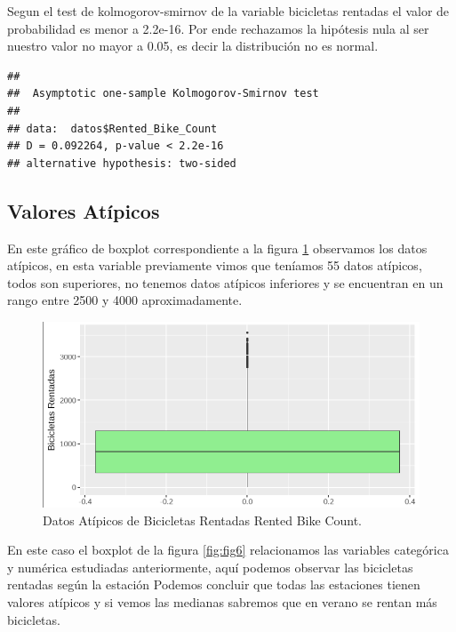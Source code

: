 \documentclass[]{elsarticle} %
\begin{document}
Segun el test de kolmogorov-smirnov de la variable bicicletas rentadas
el valor de probabilidad es menor a 2.2e-16. Por ende rechazamos la
hipótesis nula al ser nuestro valor no mayor a 0.05, es decir la
distribución no es normal.

\begin{verbatim}
## 
##  Asymptotic one-sample Kolmogorov-Smirnov test
## 
## data:  datos$Rented_Bike_Count
## D = 0.092264, p-value < 2.2e-16
## alternative hypothesis: two-sided
\end{verbatim}

\newpage
\subsection{Valores Atípicos}

En este gráfico de boxplot correspondiente a la figura \ref{fig:fig5}
observamos los datos atípicos, en esta variable previamente vimos que
teníamos 55 datos atípicos, todos son superiores, no tenemos datos
atípicos inferiores y se encuentran en un rango entre 2500 y 4000
aproximadamente.

\begin{figure}[H]

{\centering \includegraphics[width=1\linewidth]{datos_atypical} 

}

\caption{\label{fig:fig5}Datos Atípicos de Bicicletas Rentadas Rented Bike Count. }\label{fig:fig5}
\end{figure}
\newpage

En este caso el boxplot de la figura \ref{fig:fig6} relacionamos las
variables categórica y numérica estudiadas anteriormente, aquí podemos
observar las bicicletas rentadas según la estación Podemos concluir que
todas las estaciones tienen valores atípicos y si vemos las medianas
sabremos que en verano se rentan más bicicletas.
\end{document}
